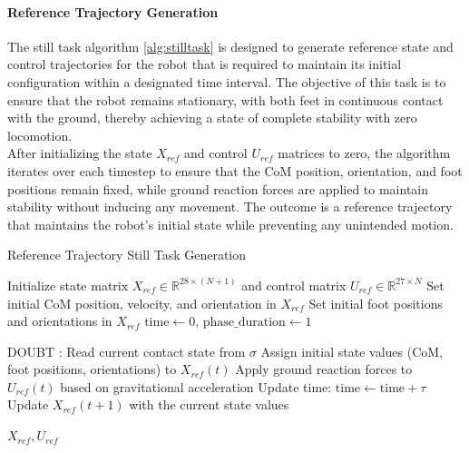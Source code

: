 \documentclass[main.tex]{subfiles}
\begin{document}
\paragraph{Reference Trajectory Generation} 
The still task algorithm \ref{alg:stilltask} is designed to generate reference state and control trajectories for the robot that is required to maintain its initial configuration within a designated time interval. The objective of this task is to ensure that the robot remains stationary, with both feet in continuous contact with the ground, thereby achieving a state of complete stability with zero locomotion. \\
After initializing the state $X_{ref}$ and control $U_{ref}$ matrices to zero, the algorithm iterates over each timestep to ensure that the CoM position, orientation, and foot positions remain fixed, while ground reaction forces are applied to maintain stability without inducing any movement. The outcome is a reference trajectory that maintains the robot's initial state while preventing any unintended motion.\\
\begin{algorithm}[H]
    \label{alg:stilltask}
    \caption{Reference Trajectory Still Task Generation}
    \begin{algorithmic}[1]
    \State Initialize state matrix \( X_{ref} \in \mathbb{R}^{28 \times (N+1)} \) and control matrix \( U_{ref} \in \mathbb{R}^{27 \times N} \)
    \State Set initial CoM position, velocity, and orientation in \( X_{ref} \)
    \State Set initial foot positions and orientations in \( X_{ref} \)
    \State \( \text{time} \gets 0 \), \( \text{phase\_duration} \gets 1 \) 
    
        \State DOUBT : Read current contact state from $\sigma$
        \State Assign initial state values (CoM, foot positions, orientations) to \( X_{ref}(t) \)
        \State Apply ground reaction forces to \( U_{ref}(t) \) based on gravitational acceleration
        \State Update time: \( \text{time} \gets \text{time} + \tau \)
        \State Update \( X_{ref}(t+1) \) with the current state values
    \EndFor
    
    \State \Return \( X_{ref}, U_{ref} \)
    
    \end{algorithmic}
\end{algorithm} 
\end{document}
